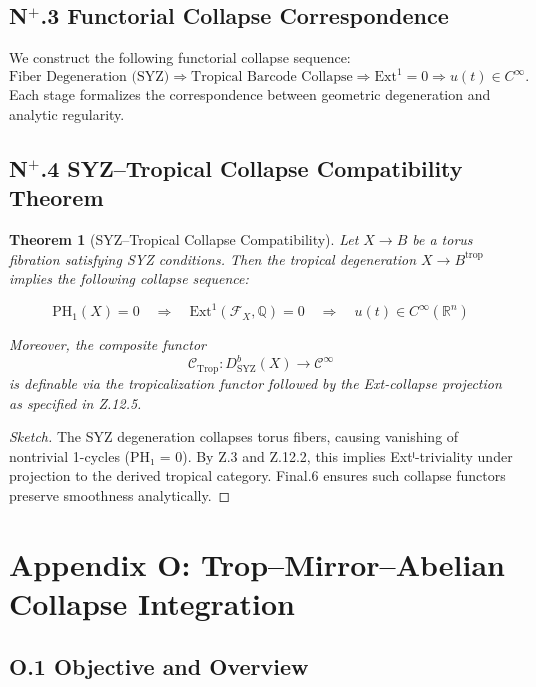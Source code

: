 \documentclass[11pt]{article}
\newtheorem{theorem}{Theorem}[section]
\begin{document}
\begin{axiom}
\begin{axiom}
{{\subsection*{N$^+$.3 Functorial Collapse Correspondence}
We construct the following functorial collapse sequence:
\[
\text{Fiber Degeneration (SYZ)} \Rightarrow \text{Tropical Barcode Collapse} \Rightarrow \mathrm{Ext}^1 = 0 \Rightarrow u(t) \in C^\infty.
\]
Each stage formalizes the correspondence between geometric degeneration and analytic regularity.

\subsection*{N$^+$.4 SYZ–Tropical Collapse Compatibility Theorem}

\begin{theorem}[SYZ–Tropical Collapse Compatibility]
Let \( X \to B \) be a torus fibration satisfying SYZ conditions.  
Then the tropical degeneration \( X \to B^{\mathrm{trop}} \) implies the following collapse sequence:

\[
\mathrm{PH}_1(X) = 0 \quad \Rightarrow \quad \mathrm{Ext}^1(\mathcal{F}_X, \mathbb{Q}) = 0 \quad \Rightarrow \quad u(t) \in C^\infty(\mathbb{R}^n)
\]

Moreover, the composite functor
\[
\mathcal{C}_{\mathrm{Trop}} : D^b_{\mathrm{SYZ}}(X) \to \mathcal{C}^\infty
\]
is definable via the tropicalization functor followed by the Ext-collapse projection as specified in Z.12.5.
\end{theorem}

\begin{proof}[Sketch]
The SYZ degeneration collapses torus fibers, causing vanishing of nontrivial 1-cycles (PH₁ = 0).  
By Z.3 and Z.12.2, this implies Extⁱ-triviality under projection to the derived tropical category.  
Final.6 ensures such collapse functors preserve smoothness analytically.
\end{proof}


\section*{Appendix O: Trop--Mirror--Abelian Collapse Integration}

\subsection*{O.1 Objective and Overview}

}}
\end{axiom}
\end{axiom}
\end{document}
